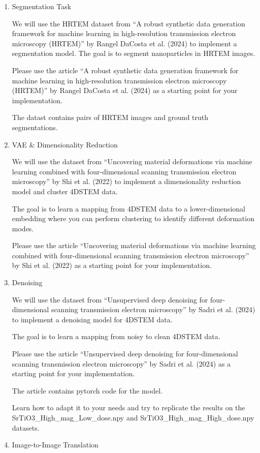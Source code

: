 \documentclass[
]{agujournal2019}
\begin{document}
\begin{enumerate}
\def\labelenumi{\arabic{enumi}.}
\item
  Segmentation Task

  We will use the HRTEM dataset from ``A robust synthetic data
  generation framework for machine learning in high-resolution
  transmission electron microscopy (HRTEM)'' by Rangel DaCosta et al.
  (2024) to implement a segmentation model. The goal is to segment
  nanoparticles in HRTEM images.

  Please use the article ``A robust synthetic data generation framework
  for machine learning in high-resolution transmission electron
  microscopy (HRTEM)'' by Rangel DaCosta et al. (2024) as a starting
  point for your implementation.

  The datast contains pairs of HRTEM images and ground truth
  segmentations.
\item
  VAE \& Dimensionality Reduction

  We will use the dataset from ``Uncovering material deformations via
  machine learning combined with four-dimensional scanning transmission
  electron microscopy'' by Shi et al. (2022) to implement a
  dimensionality reduction model and cluster 4DSTEM data.

  The goal is to learn a mapping from 4DSTEM data to a lower-dimensional
  embedding where you can perform clustering to identify different
  deformation modes.

  Please use the article ``Uncovering material deformations via machine
  learning combined with four-dimensional scanning transmission electron
  microscopy'' by Shi et al. (2022) as a starting point for your
  implementation.
\item
  Denoising

  We will use the dataset from ``Unsupervised deep denoising for
  four-dimensional scanning transmission electron microscopy'' by Sadri
  et al. (2024) to implement a denoising model for 4DSTEM data.

  The goal is to learn a mapping from noisy to clean 4DSTEM data.

  Please use the article ``Unsupervised deep denoising for
  four-dimensional scanning transmission electron microscopy'' by Sadri
  et al. (2024) as a starting point for your implementation.

  The article contains pytorch code for the model.

  Learn how to adapt it to your needs and try to replicate the results
  on the SrTiO3\_High\_mag\_Low\_dose.npy and
  SrTiO3\_High\_mag\_High\_dose.npy datasets.
\item
  Image-to-Image Translation


\end{enumerate}
\end{document}
